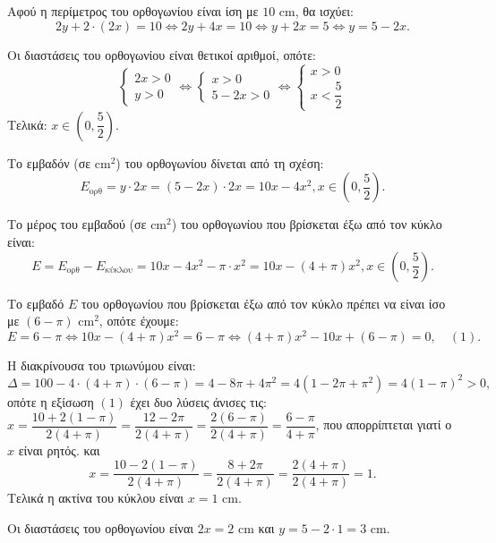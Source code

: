 
\begin{alist}
\item 
\begin{rlist}
\item Αφού η περίμετρος του ορθογωνίου είναι ίση με $10\text{ cm}$, θα ισχύει:
\[2y + 2 \cdot (2x) = 10 \Leftrightarrow 2y + 4x = 10 \Leftrightarrow y + 2x = 5 \Leftrightarrow y = 5 - 2x.\]

Οι διαστάσεις του ορθογωνίου είναι θετικοί αριθμοί, οπότε:
\[\begin{cases} 2x > 0 \\ y > 0 \end{cases} \Leftrightarrow \begin{cases} x > 0 \\ 5 - 2x > 0 \end{cases} \Leftrightarrow \begin{cases} x > 0 \\ x < \dfrac{5}{2} \end{cases}\]
Τελικά: $x \in \left(0, \dfrac{5}{2}\right)$.
\item Το εμβαδόν (σε $\text{cm}^2$) του ορθογωνίου δίνεται από τη σχέση:
\[E_{\text{ορθ}} = y \cdot 2x = (5 - 2x) \cdot 2x = 10x - 4x^2, x \in \left(0, \dfrac{5}{2}\right).\]
\end{rlist}

\item Το μέρος του εμβαδού (σε $\text{cm}^2$) του ορθογωνίου που βρίσκεται έξω από τον κύκλο είναι:
\[E = E_{\text{ορθ}} - E_{\text{κύκλου}} = 10x - 4x^2 - \pi \cdot x^2 = 10x - (4 + \pi)x^2, x \in \left(0, \dfrac{5}{2}\right).\]

\item 
\begin{rlist}
\item Το εμβαδό $E$ του ορθογωνίου που βρίσκεται έξω από τον κύκλο πρέπει να είναι ίσο
με $(6 - \pi)\text{ cm}^2$, οπότε έχουμε:
\[E = 6 - \pi \Leftrightarrow 10x - (4 + \pi)x^2 = 6 - \pi \Leftrightarrow (4 + \pi)x^2 - 10x + (6 - \pi) = 0, \quad (1).\]

Η διακρίνουσα του τριωνύμου είναι:
\[\Delta = 100 - 4 \cdot (4 + \pi) \cdot (6 - \pi) = 4 - 8\pi + 4\pi^2 = 4(1 - 2\pi + \pi^2) = 4(1 - \pi)^2 > 0,\]
οπότε η εξίσωση $(1)$ έχει δυο λύσεις άνισες τις:
$x = \dfrac{10 + 2(1 - \pi)}{2(4 + \pi)} = \dfrac{12 - 2\pi}{2(4 + \pi)} = \dfrac{2(6 - \pi)}{2(4 + \pi)} = \dfrac{6 - \pi}{4 + \pi}$, που απορρίπτεται γιατί ο $x$ είναι ρητός.
και
\[x = \dfrac{10 - 2(1 - \pi)}{2(4 + \pi)} = \dfrac{8 + 2\pi}{2(4 + \pi)} = \dfrac{2(4 + \pi)}{2(4 + \pi)} = 1.\]
Τελικά η ακτίνα του κύκλου είναι $x = 1\text{ cm}$.

\item Οι διαστάσεις του ορθογωνίου είναι $2x = 2\text{ cm}$ και $y = 5 - 2 \cdot 1 = 3\text{ cm}$.
\end{rlist}
\end{alist}


